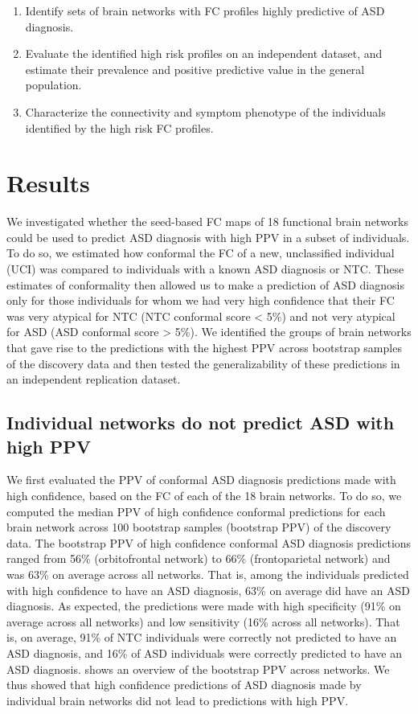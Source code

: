 \documentclass[9pt,lineno]{elife}
\begin{document}
\begin{enumerate}
    \item Identify sets of brain networks with FC profiles highly predictive of ASD diagnosis.
    \item Evaluate the identified high risk profiles on an independent dataset, and estimate their prevalence and positive predictive value in the general population.
    \item Characterize the connectivity and symptom phenotype of the individuals identified by the high risk FC profiles.
\end{enumerate}

\section{Results}
We investigated whether the seed-based FC maps of 18 functional brain networks could be used to predict ASD diagnosis with high PPV in a subset of individuals. To do so, we estimated how conformal the FC of a new, unclassified individual (UCI) was compared to individuals with a known ASD diagnosis or NTC. These estimates of conformality then allowed us to make a prediction of ASD diagnosis only for those individuals for whom we had very high confidence that their FC was very atypical for NTC (NTC conformal score < 5\%) and not very atypical for ASD (ASD conformal score > 5\%). We identified the groups of brain networks that gave rise to the predictions with the highest PPV across bootstrap samples of the discovery data and then tested the generalizability of these predictions in an independent replication dataset.

\subsection{Individual networks do not predict ASD with high PPV}
We first evaluated the PPV of conformal ASD diagnosis predictions made with high confidence, based on the FC of each of the 18 brain networks. To do so, we computed the median PPV of high confidence conformal predictions for each brain network across 100 bootstrap samples (bootstrap PPV) of the discovery data. The bootstrap PPV of high confidence conformal ASD diagnosis predictions ranged from 56\% (orbitofrontal network) to 66\% (frontoparietal network) and was 63\% on average across all networks. That is, among the individuals predicted with high confidence to have an ASD diagnosis, 63\% on average did have an ASD diagnosis. As expected, the predictions were made with high specificity (91\% on average across all networks) and low sensitivity (16\% across all networks). That is, on average, 91\% of NTC individuals were correctly not predicted to have an ASD diagnosis, and 16\% of ASD individuals were correctly predicted to have an ASD diagnosis.  shows an overview of the bootstrap PPV across networks. We thus showed that high confidence predictions of ASD diagnosis made by individual brain networks did not lead to predictions with high PPV. 
\end{document}
